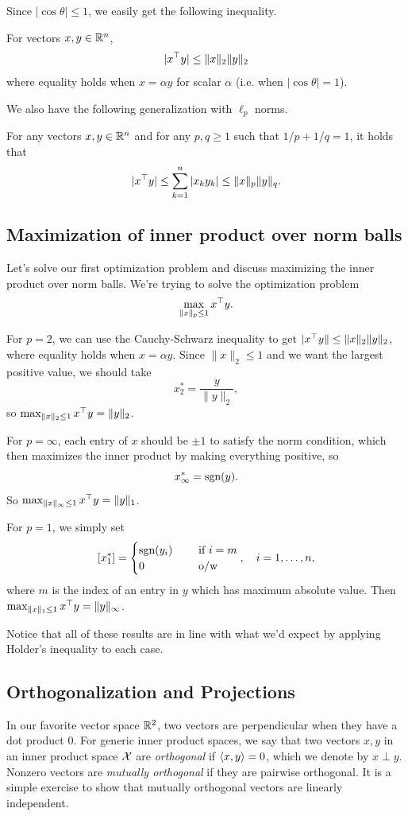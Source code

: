 \documentclass[11 pt]{scrartcl}
\begin{document}
Since $|\cos\theta| \leq 1$, we easily get the following inequality. 
\begin{theorem}
    For vectors $x,y\in \mathbb R^n$, 
    \[ |x^\top y| \leq \|x\|_2 \|y\|_2\] 
    where equality holds when $x = \alpha y$ for scalar $\alpha$ (i.e. when $|\cos\theta| = 1$). 
    \label{thm:cs}
\end{theorem}

We also have the following generalization with $\ell_p$ norms. 
\begin{theorem}
    For any vectors $x,y\in \mathbb R^n$ and for any $p,q \geq 1$ such that $1/p + 1/q = 1$, it holds that 
    \[ |x^\top y| \leq \sum_{k=1}^n|x_ky_k| \leq \|x\|_p \|y\|_q.\] 
    \label{thm:holder}
\end{theorem}

\subsection{Maximization of inner product over norm balls}
Let's solve our first optimization problem and discuss maximizing the inner product over norm balls. 
We're trying to solve the optimization problem 
\[ \max_{\|x\|_p\leq 1} x^\top y.\] 

For $p=2$, we can use the Cauchy-Schwarz inequality to get $|x^\top y\| \leq \|x\|_2 \|y\|_2$, where equality holds when $x = \alpha y$. 
Since $\|x\|_2 \leq 1$ and we want the largest positive value, we should take 
\[ x_2^* = \frac{y}{\|y\|_2},\]
so $\max_{\|x\|_2\leq 1} x^\top y = \|y\|_2$. 

For $p=\infty$, each entry of $x$ should be $\pm 1$ to satisfy the norm condition, which then maximizes the inner product by making everything positive, so 
\[ x_\infty^* = \text{sgn}(y).\] 
So $\max_{\|x\|_\infty \leq 1} x^\top y = \|y\|_1$. 

For $p=1$, we simply set 
\[ [x_1^*] = \begin{cases} \text{sgn}(y_i)\quad &\text{ if }i = m \\ 0 \quad &\text{ o/w } \end{cases},\quad i= 1,\dots, n,\] 
where $m$ is the index of an entry in $y$ which has maximum absolute value. 
Then $\max_{\| x\|_1 \leq 1} x^\top y = \|y\|_\infty$. 

Notice that all of these results are in line with what we'd expect by applying Holder's inequality to each case.


\subsection{Orthogonalization and Projections} 
In our favorite vector space $\mathbb R^2$, two vectors are perpendicular when they have a dot product 0.
For generic inner product spaces, we say that two vectors $x,y$ in an inner product space $\mathcal X$ are \emph{orthogonal} if $\left\langle x,y \right\rangle = 0$, which we denote by $x\perp y$. 
Nonzero vectors are \emph{mutually orthogonal} if they are pairwise orthogonal.
It is a simple exercise to show that mutually orthogonal vectors are linearly independent.
\end{document}
